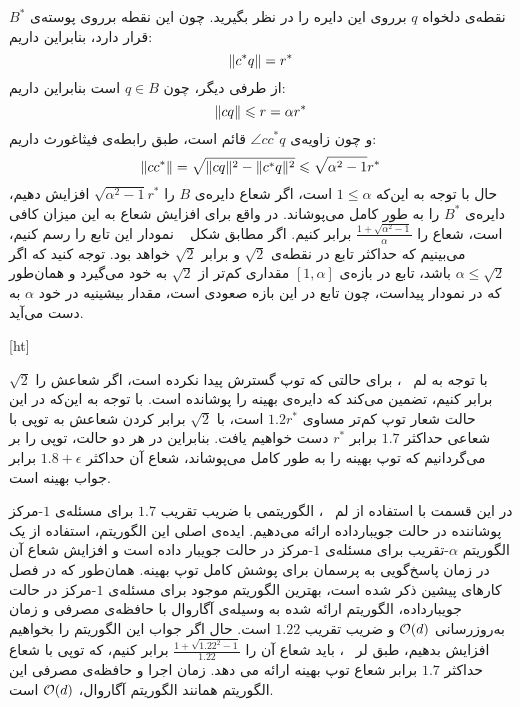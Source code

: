نقطه‌ی دلخواه $q$ برروی این دایره را در نظر بگیرید. چون این نقطه برروی پوسته‌ی $B^*$ قرار دارد، بنابراین داریم:
$$\|{c^* q}\| = r^*$$
از طرفی دیگر، چون $q \in B$ است بنابراین داریم:
$$\|{c q}\| \leqslant r = \alpha r^*$$
و چون زاویه‌ی $\angle{cc^*q}$ قائم است، طبق‌ رابطه‌ی فیثاغورث داریم:
$$\|{cc^*}\| = \sqrt{\|{cq}\|^2 - \|{c^*q}\|^2} \leqslant \sqrt{\alpha^2 - 1} r^*$$
حال با توجه به این‌که $1 \leq \alpha$ است، اگر شعاع دایره‌ی $B$ را $\sqrt{\alpha ^ 2 - 1}r^*$ افزایش دهیم، دایره‌ی $B^*$ را به طور کامل می‌پوشاند. در واقع برای افزایش شعاع به این میزان کافی است، شعاع را $\frac{1 + \sqrt{\alpha ^ 2 - 1}}{\alpha}$ برابر کنیم. اگر مطابق شکل ~ نمودار این تابع را رسم کنیم، می‌بینیم که حداکثر تابع در نقطه‌ی $\sqrt{2}$ و برابر $\sqrt{2}$ خواهد بود. توجه کنید که اگر $\alpha \leq \sqrt{2}$ باشد، تابع در بازه‌ی $[1, \alpha]$ مقداری کم‌تر از $\sqrt{2}$ به خود می‌گیرد و همان‌طور که در نمودار پیداست، چون تابع در این بازه صعودی است، مقدار بیشینیه در خود $\alpha$ به دست می‌آید.



[ht]

با توجه به لم ~، برای حالتی که توپ گسترش پیدا نکرده است، اگر شعاعش را $\sqrt{2}$ برابر کنیم، تضمین می‌کند که دایره‌ی بهینه را پوشانده است. با توجه به این‌که در این حالت شعار توپ کم‌تر  مساوی $1.2r^*$ است، با $\sqrt{2}$ برابر کردن شعاعش به توپی با شعاعی حداکثر $1.7$ برابر $r^*$ دست خواهیم یافت. بنابراین در هر دو حالت، توپی را بر می‌گردانیم که توپ بهینه را به طور کامل می‌پوشاند، شعاع آن حداکثر $1.8 + \epsilon$ برابر جواب بهینه است.


در این قسمت با استفاده از‌ لم ~، الگوریتمی با ضریب تقریب $1.7$ برای مسئله‌ی $1$-مرکز پوشاننده در حالت جویبارداده ارائه می‌دهیم. ایده‌ی اصلی این الگوریتم، استفاده از یک الگوریتم $\alpha$-تقریب برای مسئله‌ی $1$-مرکز در حالت جویبار داده است و افزایش شعاع آن در زمان پاسخ‌گویی به پرسمان برای پوشش کامل توپ بهینه. همان‌طور که در فصل کارهای پیشین ذکر شده است، بهترین الگوریتم موجود برای مسئله‌ی $1$-مرکز در حالت جویبارداده، الگوریتم ارائه شده به وسیله‌ی آگاروال با حافظه‌ی مصرفی و زمان به‌روزرسانی $\mathcal{O}(d)$ و ضریب تقریب $1.22$ است.
حال اگر جواب این الگوریتم را بخواهیم افزایش بدهیم، طبق‌ لر ~، باید شعاع آن را $\frac{1 + \sqrt{1.22^2 - 1}}{1.22}$ برابر کنیم، که توپی با شعاع حداکثر $1.7$ برابر شعاع توپ بهینه ارائه می دهد. زمان اجرا و حافظه‌ی مصرفی این الگوریتم همانند الگوریتم آگاروال، $\mathcal{O}(d)$ است.

